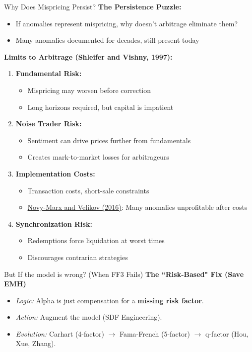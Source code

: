 \documentclass{beamer}
\begin{document}
\begin{frame}{Why Does Mispricing Persist?}
    \textbf{The Persistence Puzzle:}
    \begin{itemize}
        \item If anomalies represent mispricing, why doesn't arbitrage eliminate them?
        \item Many anomalies documented for decades, still present today
    \end{itemize}
    
    \vspace{0.3cm}
    \textbf{Limits to Arbitrage (Shleifer and Vishny, 1997):}
    \begin{enumerate}
        \item \textbf{Fundamental Risk:}
        \begin{itemize}
            \item Mispricing may worsen before correction
            \item Long horizons required, but capital is impatient
        \end{itemize}
        \item \textbf{Noise Trader Risk:}
        \begin{itemize}
            \item Sentiment can drive prices further from fundamentals
            \item Creates mark-to-market losses for arbitrageurs
        \end{itemize}
        \item \textbf{Implementation Costs:}
        \begin{itemize}
            \item Transaction costs, short-sale constraints
            \item \textcolor{blue}{\href{https://doi.org/10.1093/rfs/hhv063}{Novy-Marx and Velikov (2016)}}: Many anomalies unprofitable after costs
        \end{itemize}
        \item \textbf{Synchronization Risk:}
        \begin{itemize}
            \item Redemptions force liquidation at worst times
            \item Discourages contrarian strategies
        \end{itemize}
    \end{enumerate}
\end{frame}

\begin{frame}{But If the model is wrong? (When FF3 Fails)}
         \textbf{The ``Risk-Based" Fix (Save EMH)}
        \begin{itemize}
            \item \textit{Logic:} Alpha is just compensation for a \textbf{missing risk factor}.
            \item \textit{Action:} Augment the model (SDF Engineering).
            \item \textit{Evolution:} Carhart (4-factor) $\rightarrow$ Fama-French (5-factor) $\rightarrow$ q-factor (Hou, Xue, Zhang).
        \end{itemize}
\end{frame}
\end{document}

